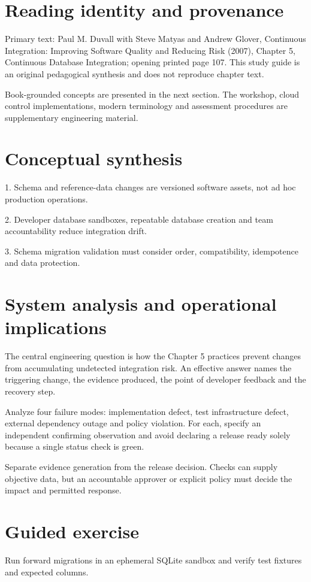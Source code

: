 \documentclass[11pt,letterpaper]{article}
\begin{document}
\makedoctitle
\makedocsummary
\tableofcontents
\clearpage
\section{Reading identity and provenance}
Primary text: Paul M. Duvall with Steve Matyas and Andrew Glover, Continuous Integration: Improving Software Quality and Reducing Risk (2007), Chapter 5, Continuous Database Integration; opening printed page 107. This study guide is an original pedagogical synthesis and does not reproduce chapter text.

Book-grounded concepts are presented in the next section. The workshop, cloud control implementations, modern terminology and assessment procedures are supplementary engineering material.

\section{Conceptual synthesis}
1. Schema and reference-data changes are versioned software assets, not ad hoc production operations.

2. Developer database sandboxes, repeatable database creation and team accountability reduce integration drift.

3. Schema migration validation must consider order, compatibility, idempotence and data protection.

\section{System analysis and operational implications}
The central engineering question is how the Chapter 5 practices prevent changes from accumulating undetected integration risk. An effective answer names the triggering change, the evidence produced, the point of developer feedback and the recovery step.

Analyze four failure modes: implementation defect, test infrastructure defect, external dependency outage and policy violation. For each, specify an independent confirming observation and avoid declaring a release ready solely because a single status check is green.

Separate evidence generation from the release decision. Checks can supply objective data, but an accountable approver or explicit policy must decide the impact and permitted response.

\section{Guided exercise}
Run forward migrations in an ephemeral SQLite sandbox and verify test fixtures and expected columns.
\end{document}

